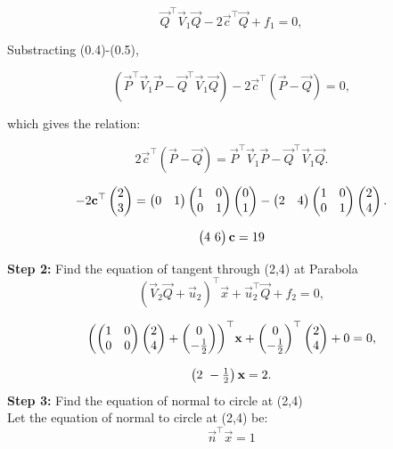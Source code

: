 \documentclass[journal]{IEEEtran}
\begin{document}
\begin{equation}
\vec{Q}^\top \vec{V}_1 \vec{Q} - 2 \vec{c}^\top \vec{Q} + f_1 = 0,
\end{equation}

Substracting (0.4)-(0.5),

\begin{equation}
(\vec{P}^\top \vec{V}_1 \vec{P} - \vec{Q}^\top \vec{V}_1 \vec{Q}) 
- 2 \vec{c}^\top (\vec{P} - \vec{Q}) = 0,
\end{equation}

which gives the relation:

\begin{equation}
2 \vec{c}^\top (\vec{P} - \vec{Q}) = \vec{P}^\top \vec{V}_1 \vec{P} - \vec{Q}^\top \vec{V}_1 \vec{Q}.
\end{equation}


\begin{equation}
-2 \mathbf{c}^\top \begin{pmatrix}2 \\ 3\end{pmatrix} = 
\begin{pmatrix}0 & 1\end{pmatrix} 
\begin{pmatrix}1 & 0 \\ 0 & 1\end{pmatrix} 
\begin{pmatrix}0 \\ 1\end{pmatrix} - 
\begin{pmatrix}2 & 4\end{pmatrix} 
\begin{pmatrix}1 & 0 \\ 0 & 1\end{pmatrix} 
\begin{pmatrix}2 \\ 4\end{pmatrix}.
\end{equation}

\begin{equation}
\begin{pmatrix}4 \ 6\end{pmatrix}\mathbf{c} = 19
\end{equation} 

\textbf{Step 2:} Find the equation of tangent through (2,4) at Parabola
\begin{equation}
(\vec{V}_2 \vec{Q} + \vec{u}_2)^\top \vec{x} + \vec{u}_2^\top \vec{Q} + f_2 = 0,
\end{equation}

\begin{equation}
\biggl(
\begin{pmatrix}1 & 0 \\ 0 & 0\end{pmatrix}
\begin{pmatrix}2 \\ 4\end{pmatrix}
+
\begin{pmatrix}0 \\ -\tfrac{1}{2}\end{pmatrix}
\biggr)^\top \mathbf{x}
+
\begin{pmatrix}0 \\ -\tfrac{1}{2}\end{pmatrix}^\top
\begin{pmatrix}2 \\ 4\end{pmatrix}
+ 0 = 0,
\end{equation}

\begin{equation}
\begin{pmatrix}2 \ -\tfrac{1}{2}\end{pmatrix} \mathbf{x} = 2.
\end{equation}
\textbf{Step 3:} Find the equation of normal to circle at (2,4)\\
Let the equation of normal to circle at (2,4) be:
\begin{equation}
\vec{n}^\top\vec{x} = 1
\end{equation}
\end{document}
